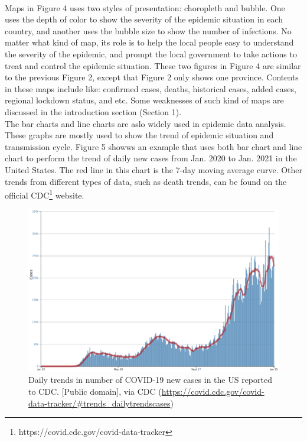 \documentclass[sigplan,screen]{acmart}
\begin{document}
\\
Maps in Figure 4 uses two styles of presentation: choropleth and bubble.
One uses the depth of color to show the severity of the epidemic situation in each country, and another uses the bubble size to show the number of infections.
No matter what kind of map, its role is to help the local people easy to understand the severity of the epidemic, and prompt the local government to take actions to treat and control the epidemic situation.
These two figures in Figure 4 are similar to the previous Figure 2, except that Figure 2 only shows one province.
Contents in these maps include like: confirmed cases, deaths, historical cases, added cases, regional lockdown status, and etc.
Some weaknesses of such kind of maps are discussed in the introduction section (Section 1).
\\
The bar charts and line charts are aslo widely used in epidemic data analysis.
These graphs are mostly used to show the trend of epidemic situation and transmission cycle.
Figure 5 showws an example that uses both bar chart and line chart to perform the trend of daily new cases from Jan. 2020 to Jan. 2021 in the United States.
The red line in this chart is the 7-day moving average curve.
Other trends from different types of data, such as death trends, can be found on the official CDC\footnote{https://covid.cdc.gov/covid-data-tracker} website.
\begin{figure}[htb]
	\centering\includegraphics[width=\linewidth]{linebar-us-1-15.png}
	\caption{Daily trends in number of COVID-19 new cases in the US reported to CDC. [Public domain], via CDC (\url{https://covid.cdc.gov/covid-data-tracker/\#trends_dailytrendscases})}
\end{figure}
\end{document}
